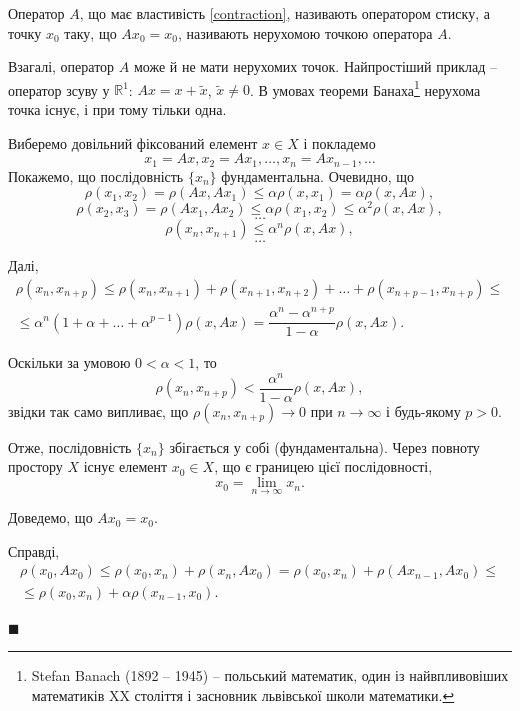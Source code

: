 \documentclass[14pt,twoside]{extreport}
\theoremstyle{mystyle}
\renewenvironment{proof}{{\bfseries Доведення.}}{$\blacksquare$}
\numberwithin{equation}{chapter}
\begin{document}
Оператор $A$, що має властивість \eqref{contraction}, називають оператором стиску, а точку $x_0$ таку, що $Ax_0 = x_0$, називають нерухомою точкою оператора $A$.

Взагалі, оператор $A$ може й не мати нерухомих точок. Найпростіший приклад -- оператор зсуву у $\mathbb{R}^1$: $Ax = x + \tilde{x}$, $\tilde{x} \neq 0$. В умовах теореми Банаха\footnote{Stefan Banach (1892 -- 1945) -- польський математик, один із найвпливовіших математиків XX століття і засновник львівської школи математики.} нерухома точка існує, і при тому тільки одна.

\begin{proof}
 Виберемо довільний фіксований елемент $x \in X$ і покладемо
\[
 x_1= Ax, x_2=Ax_1, \ldots, x_n=Ax_{n-1}, \ldots
\]
Покажемо, що послідовність $\{x_n\}$ фундаментальна. Очевидно, що
\[
 \rho(x_1, x_2) = \rho(Ax, Ax_1) \leqslant \alpha \rho(x, x_1) = \alpha \rho(x, Ax),
\]
\[
 \rho(x_2, x_3) = \rho(Ax_1, Ax_2) \leqslant \alpha \rho(x_1, x_2) \leqslant \alpha^2 \rho(x, Ax),
\]
\[
 \ldots
\]
\[
 \rho(x_n, x_{n+1}) \leqslant \alpha^n \rho(x, Ax),
\]
\[
 \ldots
\]

Далі,
\begin{multline}\label{estofcontr}
  \rho(x_n, x_{n+p}) \leqslant \rho(x_n, x_{n+1}) + \rho(x_{n+1}, x_{n+2}) + \ldots + \rho(x_{n+p-1}, x_{n+p})\leqslant\\
  \leqslant \alpha^n (1+\alpha + \ldots + \alpha^{p-1}) \rho(x, Ax)= \dfrac{\alpha^n-\alpha^{n+p}}{1-\alpha} \rho(x, Ax).
\end{multline}

Оскільки за умовою $0 < \alpha < 1$, то
\[
 \rho(x_n, x_{n+p}) < \dfrac{\alpha^n}{1-\alpha} \rho(x, Ax),
\]
звідки так само випливає, що $\rho(x_n, x_{n+p}) \to 0$ при $n\to\infty$ і будь-якому $p > 0$.

Отже, послідовність $\{x_n\}$ збігається у собі (фундаментальна). Через повноту простору $X$ існує елемент $x_0\in X$, що є границею цієї послідовності,
\[
 x_0=\lim\limits_{n\to\infty}x_n.
\]

Доведемо, що $Ax_0 = x_0$.

Справді,
\begin{multline*}
  \rho(x_0, Ax_0) \leqslant \rho(x_0, x_n) + \rho(x_n, Ax_0)= \rho(x_0, x_n) + \rho(Ax_{n-1}, Ax_0)\leqslant\\
  \leqslant\rho(x_0, x_n) + \alpha \rho(x_{n-1}, x_0).
\end{multline*}


\end{proof}
\end{document}
